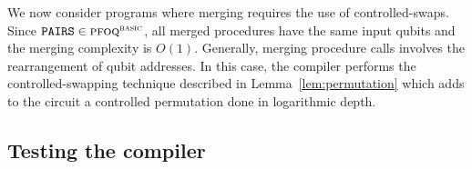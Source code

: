 \documentclass[a4paper,onecolumn,11pt,unpublished]{quantumarticle}
\newcommand{\unif}{\textnormal{\textsc{basic}}}
\newcommand{\pfoq}{\textnormal{\textsc{pfoq}}}
\begin{document}
We now consider programs where merging requires the use of controlled-swaps. Since $\texttt{PAIRS}\in\pfoq{}^\unif{}$, all merged procedures have the same input qubits and the merging complexity is $O(1)$. Generally, merging procedure calls involves the rearrangement of qubit addresses. In this case, the compiler performs the controlled-swapping technique described in Lemma~\ref{lem:permutation} which adds to the circuit a controlled permutation done in logarithmic depth.

\subsection{Testing the compiler}


\end{document}

